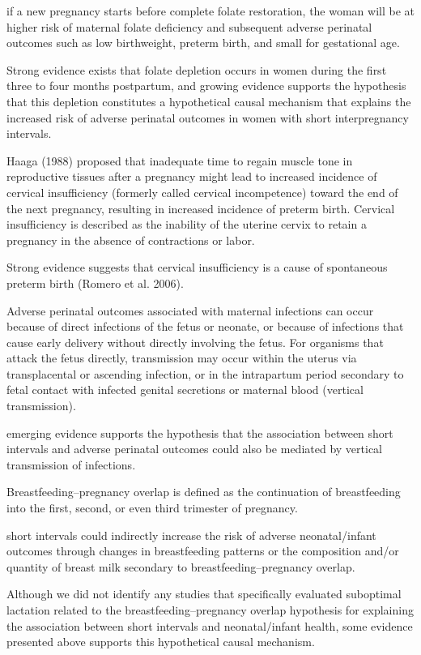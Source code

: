 if a new pregnancy starts before complete folate restoration, the woman
will be at higher risk of maternal folate deficiency and subsequent
adverse perinatal outcomes such as low birthweight, preterm birth, and
small for gestational age.

Strong evidence exists that folate depletion occurs in women during the
first three to four months postpartum, and growing evidence supports the
hypothesis that this depletion constitutes a hypothetical causal
mechanism that explains the increased risk of adverse perinatal outcomes
in women with short interpregnancy intervals.

Haaga (1988) proposed that inadequate time to regain muscle tone in
reproductive tissues after a pregnancy might lead to increased incidence
of cervical insufficiency (formerly called cervical incompetence) toward
the end of the next pregnancy, resulting in increased incidence of
preterm birth. Cervical insufficiency is described as the inability of
the uterine cervix to retain a pregnancy in the absence of contractions
or labor.

Strong evidence suggests that cervical insufficiency is a cause of
spontaneous preterm birth (Romero et al. 2006).

Adverse perinatal outcomes associated with maternal infections can occur
because of direct infections of the fetus or neonate, or because of
infections that cause early delivery without directly involving the
fetus. For organisms that attack the fetus directly, transmission may
occur within the uterus via transplacental or ascending infection, or in
the intrapartum period secondary to fetal contact with infected genital
secretions or maternal blood (vertical transmission).

emerging evidence supports the hypothesis that the association between
short intervals and adverse perinatal outcomes could also be mediated by
vertical transmission of infections.

Breastfeeding–pregnancy overlap is defined as the continuation of
breastfeeding into the first, second, or even third trimester of
pregnancy.

short intervals could indirectly increase the risk of adverse
neonatal/infant outcomes through changes in breastfeeding patterns or
the composition and/or quantity of breast milk secondary to
breastfeeding–pregnancy overlap.

Although we did not identify any studies that specifically evaluated
suboptimal lactation related to the breastfeeding–pregnancy overlap
hypothesis for explaining the association between short intervals and
neonatal/infant health, some evidence presented above supports this
hypothetical causal mechanism.

